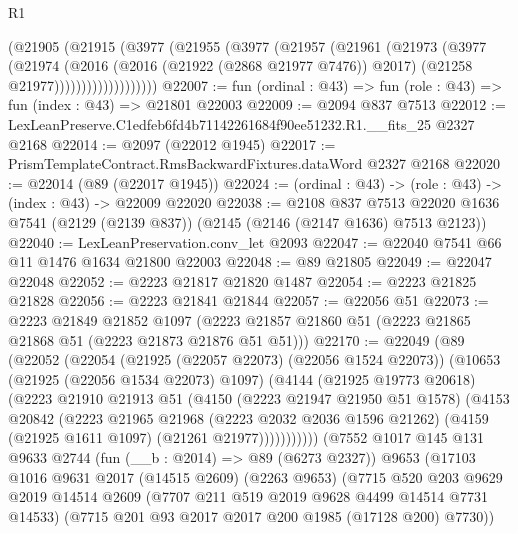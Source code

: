 \begin{lexlean}{R1}
\begin{coremodule}
                  (@21905
                    (@21915
                      (@3977
                        (@21955
                          (@3977
                            (@21957
                              (@21961
                                (@21973
                                  (@3977
                                    (@21974
                                      (@2016
                                        (@2016 (@21922 (@2868 @21977 @7476)) @2017)
                                        (@21258 @21977)))))))))))))))))))
@22007 := fun (ordinal : @43) => fun (role : @43) => fun (index : @43) => @21801 @22003
@22009 := @2094 @837 @7513
@22012 := LexLeanPreserve.C1edfeb6fd4b71142261684f90ee51232.R1.__fits_25 @2327 @2168
@22014 := @2097 (@22012 @1945)
@22017 := PrismTemplateContract.RmsBackwardFixtures.dataWord @2327 @2168
@22020 := @22014 (@89 (@22017 @1945))
@22024 := (ordinal : @43) -> (role : @43) -> (index : @43) -> @22009 @22020
@22038 := @2108
    @837
    @7513
    @22020
    @1636
    @7541
    (@2129 (@2139 @837))
    (@2145 (@2146 (@2147 @1636) @7513 @2123))
@22040 := LexLeanPreservation.conv_let @2093
@22047 := @22040 @7541 @66 @11 @1476 @1634 @21800 @22003
@22048 := @89 @21805
@22049 := @22047 @22048
@22052 := @2223 @21817 @21820 @1487
@22054 := @2223 @21825 @21828
@22056 := @2223 @21841 @21844
@22057 := @22056 @51
@22073 := @2223
    @21849
    @21852
    @1097
    (@2223 @21857 @21860 @51 (@2223 @21865 @21868 @51 (@2223 @21873 @21876 @51 @51)))
@22170 := @22049
    (@89
      (@22052
        (@22054
          (@21925 (@22057 @22073) (@22056 @1524 @22073))
          (@10653
            (@21925 (@22056 @1534 @22073) @1097)
            (@4144
              (@21925 @19773 @20618)
              (@2223
                @21910
                @21913
                @51
                (@4150
                  (@2223 @21947 @21950 @51 @1578)
                  (@4153
                    @20842
                    (@2223
                      @21965
                      @21968
                      (@2223 @2032 @2036 @1596 @21262)
                      (@4159 (@21925 @1611 @1097) (@21261 @21977)))))))))))
    (@7552
      @1017
      @145
      @131
      @9633
      @2744
      (fun (__b : @2014) => @89 (@6273 @2327))
      @9653
      (@17103
        @1016
        @9631
        @2017
        (@14515 @2609)
        (@2263 @9653)
        (@7715
          @520
          @203
          @9629
          @2019
          @14514
          @2609
          (@7707 @211 @519 @2019 @9628 @4499 @14514 @7731 @14533)
          (@7715 @201 @93 @2017 @2017 @200 @1985 (@17128 @200) @7730))

\end{coremodule}
\end{lexlean}
